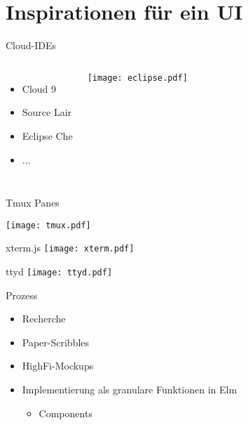 \documentclass[compress]{beamer}
\begin{document}
\section{Inspirationen für ein UI}
\begin{frame}{Cloud-IDEs}
  \begin{columns}
    \begin{itemize}
      \item Cloud 9
      \item Source Lair
      \item Eclipse Che
      \item ...
    \end{itemize}

    \texttt{[image: eclipse.pdf]}
  \end{columns}
\end{frame}
\begin{frame}{Tmux Panes}

  \texttt{[image: tmux.pdf]}
\end{frame}
\begin{frame}{xterm.js}
  \texttt{[image: xterm.pdf]}
\end{frame}
\begin{frame}{ttyd}
  \texttt{[image: ttyd.pdf]}
\end{frame}

\begin{frame}{Prozess}
  \begin{itemize}
    \item Recherche
    \item Paper-Scribbles
    \item HighFi-Mockups
    \item Implementierung als granulare Funktionen in Elm
      \begin{itemize}
          \item Components
      \end{itemize}
  \end{itemize}
\end{frame}
\end{document}
